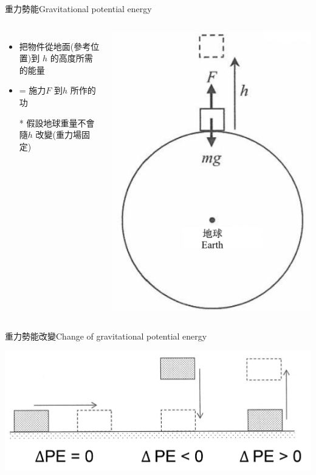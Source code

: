 \documentclass[beamer=true]{standalone}
\begin{document}
\begin{frame}{重力勢能Gravitational potential energy}
    \begin{columns}
        \begin{itemize}
            \item 把物件從地面(參考位置)到 $h$ 的高度所需的能量
            \item = 施力$F$ 到$h$ 所作的功
            \item[*] 假設地球重量不會隨$h$ 改變(重力場固定)
        \end{itemize}
        {\par\centering
            \includegraphics[width=.8\textwidth]{assets/9272e1df.png}
            \par}
    \end{columns}
\end{frame}

\begin{frame}{重力勢能改變Change of gravitational potential energy}\par
    {\par\centering
        \includegraphics[width=.8\textwidth]{assets/0a3fcefd.png}
        \par}
\end{frame}
\end{document}
